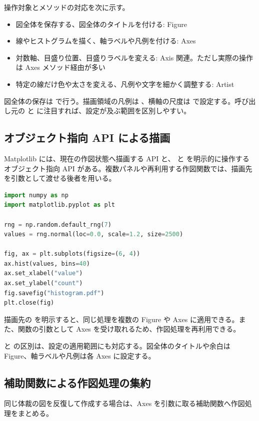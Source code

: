 操作対象とメソッドの対応を次に示す。

\begin{itemize}
\item 図全体を保存する、図全体のタイトルを付ける: Figure
\item 線やヒストグラムを描く、軸ラベルや凡例を付ける: Axes
\item 対数軸、目盛り位置、目盛りラベルを変える: Axis 関連。ただし実際の操作は Axes メソッド経由が多い
\item 特定の線だけ色や太さを変える、凡例や文字を細かく調整する: Artist
\end{itemize}

図全体の保存は  で行う。描画領域の凡例は 、横軸の尺度は  で設定する。呼び出し元の  と  に注目すれば、設定が及ぶ範囲を区別しやすい。

\subsection{オブジェクト指向 API による描画}

Matplotlib には、現在の作図状態へ描画する  API と、 と  を明示的に操作するオブジェクト指向 API がある。複数パネルや再利用する作図関数では、描画先を引数として渡せる後者を用いる。

\begin{lstlisting}[language=Python]
import numpy as np
import matplotlib.pyplot as plt

rng = np.random.default_rng(7)
values = rng.normal(loc=0.0, scale=1.2, size=2500)

fig, ax = plt.subplots(figsize=(6, 4))
ax.hist(values, bins=40)
ax.set_xlabel("value")
ax.set_ylabel("count")
fig.savefig("histogram.pdf")
plt.close(fig)
\end{lstlisting}

描画先の  を明示すると、同じ処理を複数の Figure や Axes に適用できる。また、関数の引数として Axes を受け取れるため、作図処理を再利用できる。

 と  の区別は、設定の適用範囲にも対応する。図全体のタイトルや余白は Figure、軸ラベルや凡例は各 Axes に設定する。

\subsection{補助関数による作図処理の集約}

同じ体裁の図を反復して作成する場合は、Axes を引数に取る補助関数へ作図処理をまとめる。

